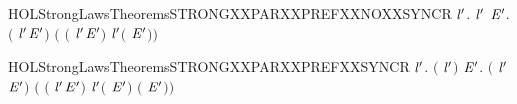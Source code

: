 \begin{SaveVerbatim}{HOLStrongLawsTheoremsSTRONGXXPARXXPREFXXNOXXSYNCR}
\HOLTokenTurnstile{} \HOLSymConst{\HOLTokenForall{}} \ensuremath{\HOLBoundVar{l}\sp{\prime{}}}.
      \HOLSymConst{\HOLTokenNotEqual{}}  \ensuremath{\HOLBoundVar{l}\sp{\prime{}}} \HOLSymConst{\HOLTokenImp{}}
     \HOLSymConst{\HOLTokenForall{}} \ensuremath{\HOLBoundVar{E}\sp{\prime{}}}.
        \ensuremath{(} \HOLSymConst{\ensuremath{\ldotp}} \HOLSymConst{\ensuremath{\mid}}  \ensuremath{\HOLBoundVar{l}\sp{\prime{}}}\HOLSymConst{\ensuremath{\ldotp}}\ensuremath{\HOLBoundVar{E}\sp{\prime{}}}\ensuremath{)}
         \ensuremath{(} \HOLSymConst{\ensuremath{\ldotp}}\ensuremath{(} \HOLSymConst{\ensuremath{\mid}}  \ensuremath{\HOLBoundVar{l}\sp{\prime{}}}\HOLSymConst{\ensuremath{\ldotp}}\ensuremath{\HOLBoundVar{E}\sp{\prime{}}}\ensuremath{)} \HOLSymConst{\ensuremath{+}}  \ensuremath{\HOLBoundVar{l}\sp{\prime{}}}\HOLSymConst{\ensuremath{\ldotp}}\ensuremath{(} \HOLSymConst{\ensuremath{\ldotp}} \HOLSymConst{\ensuremath{\mid}} \ensuremath{\HOLBoundVar{E}\sp{\prime{}}}\ensuremath{)}\ensuremath{)}
\end{SaveVerbatim}
\newcommand{\HOLStrongLawsTheoremsSTRONGXXPARXXPREFXXNOXXSYNCR}{\UseVerbatim{HOLStrongLawsTheoremsSTRONGXXPARXXPREFXXNOXXSYNCR}}
\begin{SaveVerbatim}{HOLStrongLawsTheoremsSTRONGXXPARXXPREFXXSYNCR}
\HOLTokenTurnstile{} \HOLSymConst{\HOLTokenForall{}} \ensuremath{\HOLBoundVar{l}\sp{\prime{}}}.
     \ensuremath{(} \HOLSymConst{\ensuremath{=}}  \ensuremath{\HOLBoundVar{l}\sp{\prime{}}}\ensuremath{)} \HOLSymConst{\HOLTokenImp{}}
     \HOLSymConst{\HOLTokenForall{}} \ensuremath{\HOLBoundVar{E}\sp{\prime{}}}.
        \ensuremath{(} \HOLSymConst{\ensuremath{\ldotp}} \HOLSymConst{\ensuremath{\mid}}  \ensuremath{\HOLBoundVar{l}\sp{\prime{}}}\HOLSymConst{\ensuremath{\ldotp}}\ensuremath{\HOLBoundVar{E}\sp{\prime{}}}\ensuremath{)}
         \ensuremath{(} \HOLSymConst{\ensuremath{\ldotp}}\ensuremath{(} \HOLSymConst{\ensuremath{\mid}}  \ensuremath{\HOLBoundVar{l}\sp{\prime{}}}\HOLSymConst{\ensuremath{\ldotp}}\ensuremath{\HOLBoundVar{E}\sp{\prime{}}}\ensuremath{)} \HOLSymConst{\ensuremath{+}}
           \ensuremath{\HOLBoundVar{l}\sp{\prime{}}}\HOLSymConst{\ensuremath{\ldotp}}\ensuremath{(} \HOLSymConst{\ensuremath{\ldotp}} \HOLSymConst{\ensuremath{\mid}} \ensuremath{\HOLBoundVar{E}\sp{\prime{}}}\ensuremath{)} \HOLSymConst{\ensuremath{+}} \HOLConst{\ensuremath{\tau}}\HOLSymConst{\ensuremath{\ldotp}}\ensuremath{(} \HOLSymConst{\ensuremath{\mid}} \ensuremath{\HOLBoundVar{E}\sp{\prime{}}}\ensuremath{)}\ensuremath{)}
\end{SaveVerbatim}
